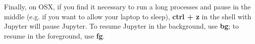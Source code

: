 Finally, on OSX, if you find it necessary to run a long processes and pause in the middle (e.g. if you want to allow your laptop to sleep), \textbf{ctrl + z} in the shell with Jupyter will pause Jupyter. To resume Jupyter in the background, use \textbf{bg}; to resume in the foreground, use \textbf{fg}.

